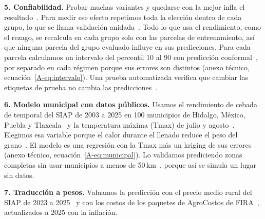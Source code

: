 \textbf{5. Confiabilidad.} Probar muchas variantes y quedarse con la mejor infla el resultado~\cite{cawley2010}. Para
medir ese efecto repetimos toda la elección dentro de cada grupo, lo que se llama validación anidada~\cite{varma2006}.
Todo lo que usa el rendimiento, como el rezago, se recalcula en cada grupo solo
con las parcelas de entrenamiento, así que ninguna parcela del grupo evaluado influye en sus predicciones. Para cada
parcela calculamos un intervalo del percentil 10 al 90 con predicción conformal~\cite{vovk2005,lei2018}, por separado
en cada régimen porque sus errores son distintos (anexo técnico, ecuación~\ref{A-eq:intervalo}). Una prueba automatizada verifica que cambiar las etiquetas de prueba no
cambia las predicciones~\cite{kaufman2012}.

\textbf{6. Modelo municipal con datos públicos.} Usamos el rendimiento de cebada de temporal del SIAP de 2003 a 2025
en 100 municipios de Hidalgo, México, Puebla y Tlaxcala~\cite{siap} y la temperatura máxima (Tmax) de julio y
agosto~\cite{chirts}. Elegimos esa variable porque el calor durante el llenado reduce el peso del
grano~\cite{passarella2002}. El modelo es una regresión con la Tmax más un kriging de sus errores~\cite{oliver2014} (anexo
técnico, ecuación~\ref{A-eq:municipal}). Lo validamos prediciendo zonas completas sin usar municipios a menos de
50\,km~\cite{roberts2017}, porque así se simula un lugar sin datos.

\textbf{7. Traducción a pesos.} Valuamos la predicción con el precio medio rural del SIAP de 2023 a
2025~\cite{siap} y con los costos de los paquetes de AgroCostos de FIRA~\cite{agrocostos}, actualizados a 2025 con
la inflación.
